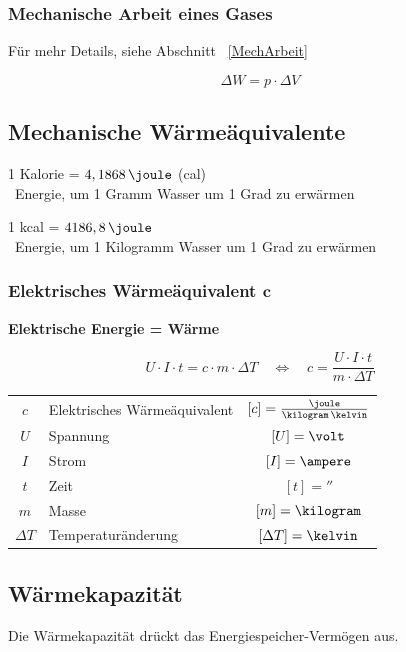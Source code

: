 \subsubsection{Mechanische Arbeit eines Gases}

Für mehr Details, siehe Abschnitt ~\ref{MechArbeit}

$$  \boxed{\Delta W = p \cdot \Delta V } $$


\subsection{Mechanische Wärmeäquivalente}

1 Kalorie = $4,1868 \, \joule$ (cal) \\
\textrightarrow\ Energie, um 1 Gramm Wasser um 1 Grad zu erwärmen

\medskip

1 kcal = $4186,8 \, \joule$ \\
\textrightarrow\ Energie, um 1 Kilogramm Wasser um 1 Grad zu erwärmen


\subsubsection{Elektrisches Wärmeäquivalent $\bm{c}$}

\textbf{Elektrische Energie = Wärme}

$$ \boxed{ U \cdot I \cdot t = c \cdot m \cdot \Delta T \quad \Leftrightarrow \quad c = \frac{U \cdot I \cdot t}{m \cdot \Delta T} } $$


\begin{tabular}{c l c}
	$c$ 		& Elektrisches Wärmeäquivalent	& $[c] = \frac{\joule}{\kilogram \, \kelvin}$		\\
	$U$ 		& Spannung			 			& $[U] = \volt$ 									\\
	$I$ 		& Strom 						& $[I] = \ampere$ 									\\
	$t$ 		& Zeit 							& $[t] = \second$			 						\\
	$m$ 		& Masse 						& $[m] = \kilogram$ 								\\
	$\Delta T$ 	& Temperaturänderung 			& $[\Delta T] = \kelvin$
\end{tabular}


\subsection{Wärmekapazität}

Die Wärmekapazität drückt das Energiespeicher-Vermögen aus.

